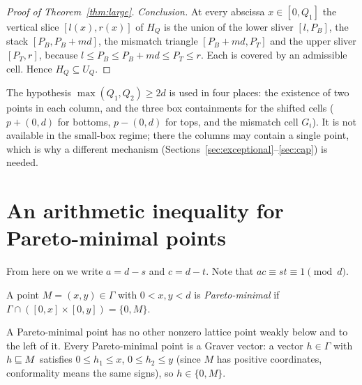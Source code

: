 \begin{proof}[Proof of Theorem~\ref{thm:large}]
\emph{Conclusion.} At every abscissa $x\in[0,Q_1]$ the vertical slice $[l(x),r(x)]$ of $H_Q$ is the union of the lower sliver $[l,P_B]$, the stack $[P_B,P_B+md]$, the mismatch triangle $[P_B+md,P_T]$ and the upper sliver $[P_T,r]$, because $l\le P_B\le P_B+md\le P_T\le r$. Each is covered by an admissible cell. Hence $H_Q\subseteq U_Q$.
\end{proof}

\begin{remark}
The hypothesis $\max(Q_1,Q_2)\ge2d$ is used in four places: the existence of two points in each column, and the three box containments for the shifted cells ($p+(0,d)$ for bottoms, $p-(0,d)$ for tops, and the mismatch cell $G_i$). It is not available in the small-box regime; there the columns may contain a single point, which is why a different mechanism (Sections~\ref{sec:exceptional}--\ref{sec:cap}) is needed.
\end{remark}

\section{An arithmetic inequality for Pareto-minimal points}\label{sec:pareto}

From here on we write $a=d-s$ and $c=d-t$. Note that $ac\equiv st\equiv1\pmod d$.

\begin{definition}
A point $M=(x,y)\in\Gamma$ with $0<x,y<d$ is \emph{Pareto-minimal} if $\Gamma\cap([0,x]\times[0,y])=\{0,M\}$.
\end{definition}

A Pareto-minimal point has no other nonzero lattice point weakly below and to the left of it. Every Pareto-minimal point is a Graver vector: a vector $h\in\Gamma$ with $h\sqsubseteq M$ satisfies $0\le h_1\le x$, $0\le h_2\le y$ (since $M$ has positive coordinates, conformality means the same signs), so $h\in\{0,M\}$.


